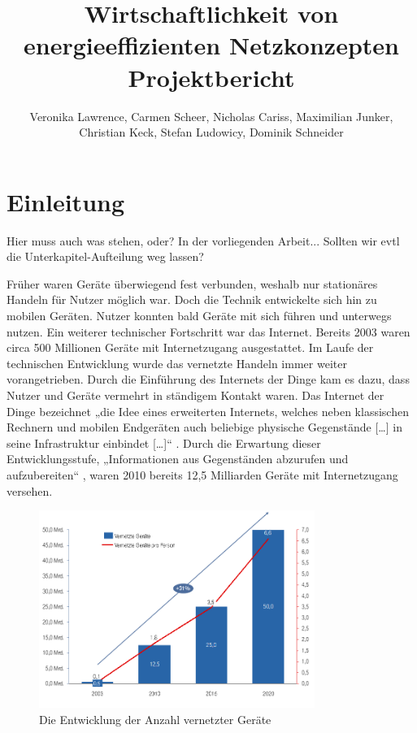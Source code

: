 \documentclass[12pt,titlepage]{article}
\newcommand{\firstpages}{

     \newpage
     \tableofcontents{}
     \addtocontents{toc}{~\hfill\textbf{Seite}\par}

     \newpage
     \listoffigures

     \newpage
     \listoftables
     \newpage
}
\begin{document}
\title{\huge{Wirtschaftlichkeit von energieeffizienten Netzkonzepten} \\ \large{Projektbericht}}
\author{Veronika Lawrence, Carmen Scheer, Nicholas Cariss, Maximilian Junker,\\ Christian Keck, Stefan Ludowicy, Dominik Schneider}
\maketitle
\firstpages

\section{Einleitung}
Hier muss auch was stehen, oder?
In der vorliegenden Arbeit...
Sollten wir evtl die Unterkapitel-Aufteilung weg lassen?

Früher waren Geräte überwiegend fest verbunden, weshalb nur stationäres Handeln für Nutzer möglich war. Doch die Technik entwickelte sich hin zu mobilen Geräten. Nutzer konnten bald Geräte mit sich führen und unterwegs nutzen. Ein weiterer technischer Fortschritt war das Internet. Bereits 2003 waren circa 500 Millionen Geräte  mit Internetzugang ausgestattet. 
Im Laufe der technischen Entwicklung wurde das vernetzte Handeln immer weiter vorangetrieben. Durch die Einführung des Internets der Dinge kam es dazu, dass Nutzer und Geräte vermehrt in ständigem Kontakt waren. Das Internet der Dinge bezeichnet „die Idee eines erweiterten Internets, welches neben klassischen Rechnern und mobilen Endgeräten auch beliebige physische Gegenstände […] in seine Infrastruktur einbindet […]“ . Durch die Erwartung dieser Entwicklungsstufe, „Informationen aus Gegenständen abzurufen und aufzubereiten“ , waren 2010 bereits 12,5 Milliarden Geräte  mit Internetzugang versehen. 

\begin{figure}[!ht]
	\centering
	\includegraphics[width=0.8\textwidth]{Entwicklung_Anzahl_vernetzte_Geraete}
	\caption{Die Entwicklung der Anzahl vernetzter Geräte}
	\label{fig:Entwicklung_Anzahl_vernetzte_Geraete}
\end{figure} 
\end{document}
